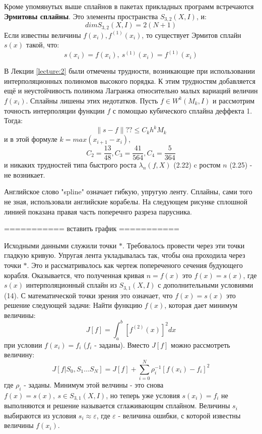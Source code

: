 Кроме упомянутых выше сплайнов в пакетах прикладных программ встречаются \textbf{Эрмитовы сплайны}. Это элементы пространства $S_{3,2}(X,I)$, и:
\begin{equation}
dim  S_{3,2}(X,I) = 2(N+1)
\end{equation}
Если известны величины $f(x_i),f^{(1)}(x_i)$, то существует Эрмитов сплайн $s(x)$ такой, что:
\begin{equation}
s(x_i)=f(x_i), \ s^{(1)}(x_i)=f^{(1)}(x_i)
\end{equation}

В Лекции \ref{lecture:2} были отмечены трудности, возникающие при использовании интерполяционных полиномов высокого порядка. К этим трудностям добавляется ещё и неустойчивость полинома Лагранжа относительно малых вариаций величин $f(x_i)$.
Сплайны лишены этих недотатков. Пусть $f\in W^k(M_k,I)$ и рассмотрим точность интерполяции функции $f$ с помощью кубического сплайна деффекта 1. Тогда:
\begin{equation}
\parallel s-f\parallel ?? \leq C_k h^k M_k
\end{equation}
и в этой формуле $k=max(x_{i+1}-x_i)$,
\begin{equation}
C_{2}=\dfrac{13}{48},C_{3}=\dfrac{41}{564},C_{4}=\dfrac{5}{364}
\end{equation}
и никаких трудностей типа быстрого роста $\lambda_n(f,X)$ (2.22) c ростом $n$ (2.25) - не возникает.

Английское слово "spline" означает гибкую, упругую ленту. Сплайны, сами того не зная, использовали английские корабелы. На следующем рисунке сплошной линией показана правая часть поперечнго разреза парусника. 

===========
вставить график
===========

Исходными данными служили точки $\ast$. Требовалось провести через эти точки гладкую кривую. Упругая лента укладывалась так, чтобы она проходила через точки $\ast$. Это и рассматривалось как чертеж попереченого сечения будующего корабля. Оказывается, что полученная кривая $n=f(x)$ это $f(x)=s(x)$, где $s(x)$ интерполяционный сплайн из $S_{3,1}(X,I)$ с дополнительными условиями (14).
С математической точки зрения это означает, что $f(x)=s(x)$ это решение следующей задачи: Найти функцию $f(x)$, которая дает минимум величины:
\begin{equation}
J[f]=\int_a^b[f^{(2)}(x)]^2dx
\end{equation}
при условии $f(x_i)=f_i$ ($f_i$ - заданы).
Вместо $J[f]$ можно рассмотреть величину:
\begin{equation}
J[ f| S_{0},S_1\ldots S_{N}] = J \left[ f\right] + \sum ^{N}_{i=0}\rho^{-1}_{i}\left[ f\left( x_{i}\right) -f_{i}\right] ^{2}
\end{equation}
где $\rho_i$ - заданы. Минимум этой велчины - это снова $f(x)=s(x), \ s\in S_{3,1}(X,I)$, 
но теперь уже условия $s(x_i)=f_i$ не выполняются и решение называется сглаживающим сплайном. Величины $s_i$ выбираются из условия $s_i\approx \varepsilon$, где $\varepsilon$ - величина ошибки, с которой известны величины $f(x_i)$.